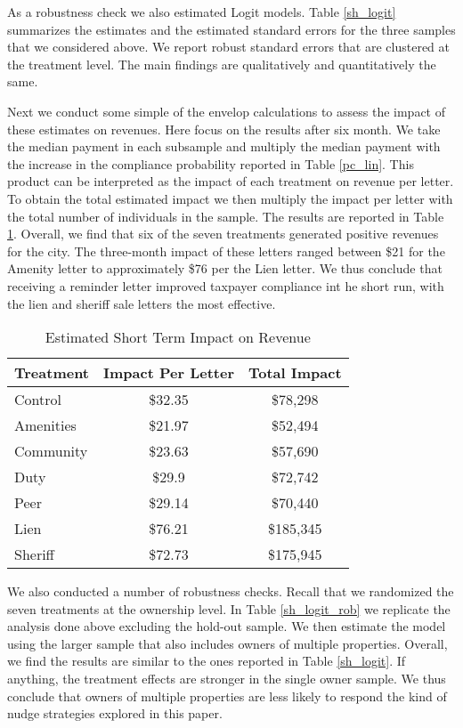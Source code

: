 \documentclass[12pt]{article}
\begin{document}
As a robustness check we also estimated Logit models. Table
\ref{sh_logit} summarizes the estimates and the estimated standard
errors for the three samples that we considered above. We report
robust standard errors that are clustered at the treatment level. The main
findings are qualitatively and quantitatively the same.

Next we conduct some simple of the envelop calculations to assess the
impact of these estimates on revenues. Here focus on the results after
six month. We take the median payment in each subsample and multiply
the median payment with the increase in the compliance probability
reported in Table \ref{pc_lin}. This product can be interpreted as the
impact of each treatment on revenue per letter. To obtain the total
estimated impact we then multiply the impact per letter with the total
number of individuals in the sample. The results are reported in Table
\ref{sh_rev}.  Overall, we find that six of the seven treatments
generated positive revenues for the city.  The three-month impact of
these letters ranged between \$21 for the Amenity letter to
approximately \$76 per the Lien letter. We thus conclude that
receiving a reminder letter improved taxpayer compliance int he short
run, with the lien and sheriff sale letters the most effective.

\begin{table}[htbp]
\caption{Estimated Short Term Impact on Revenue}\label{sh_rev}
\bigskip
\centering
\begin{tabular}{l c c}
\hline
Treatment & Impact Per Letter & Total Impact \\ 
\hline
Control & \$32.35 & \$78,298 \\ 
Amenities & \$21.97 & \$52,494 \\ 
Community & \$23.63 & \$57,690 \\ 
Duty & \$29.9 & \$72,742 \\ 
Peer & \$29.14 & \$70,440 \\ 
Lien & \$76.21 & \$185,345 \\ 
Sheriff & \$72.73 & \$175,945 \\ 
\hline
\end{tabular}
\end{table}

We also conducted a number of robustness checks. Recall that we randomized
the seven treatments at the ownership level. In Table \ref{sh_logit_rob}
we replicate the analysis done above excluding the hold-out sample. We
then estimate the model using the larger sample that also includes
owners of multiple properties. Overall, we find the results are
similar to the ones reported in Table \ref{sh_logit}. If anything,
the treatment effects are stronger in the single owner sample. We thus
conclude that owners of multiple properties are less likely to respond
the kind of nudge strategies explored in this paper.
\end{document}
